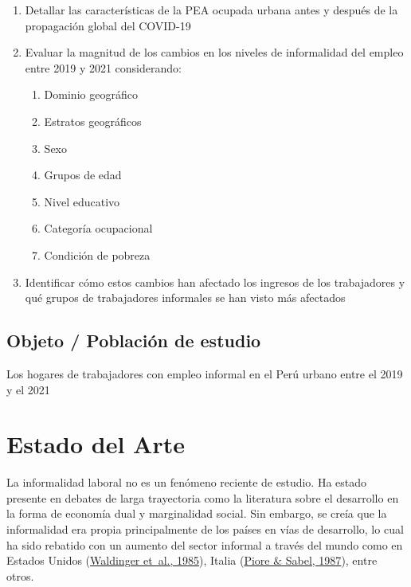 \documentclass[
  letterpaper,
  12pt,
  oneside,
  spanish,
  doublespacing,
  headsepline,
  parskip]{MastersDoctoralThesis}
\begin{document}
\begin{enumerate}
\def\labelenumi{\arabic{enumi}.}
\item
  Detallar las características de la PEA ocupada urbana antes y después
  de la propagación global del COVID-19
\item
  Evaluar la magnitud de los cambios en los niveles de informalidad del
  empleo entre 2019 y 2021 considerando:

  \begin{enumerate}
  \def\labelenumii{\roman{enumii}.}
  \item
    Dominio geográfico
  \item
    Estratos geográficos
  \item
    Sexo
  \item
    Grupos de edad
  \item
    Nivel educativo
  \item
    Categoría ocupacional
  \item
    Condición de pobreza
  \end{enumerate}
\item
  Identificar cómo estos cambios han afectado los ingresos de los
  trabajadores y qué grupos de trabajadores informales se han visto más
  afectados
\end{enumerate}

\hypertarget{objeto-poblaciuxf3n-de-estudio}{%
\section{Objeto / Población de
estudio}\label{objeto-poblaciuxf3n-de-estudio}}

Los hogares de trabajadores con empleo informal en el Perú urbano entre
el 2019 y el 2021


\hypertarget{sec-estado}{%
\chapter{Estado del Arte}\label{sec-estado}}

La informalidad laboral no es un fenómeno reciente de estudio. Ha estado
presente en debates de larga trayectoria como la literatura sobre el
desarrollo en la forma de economía dual y marginalidad social. Sin
embargo, se creía que la informalidad era propia principalmente de los
países en vías de desarrollo, lo cual ha sido rebatido con un aumento
del sector informal a través del mundo como en Estados Unidos
(\protect\hyperlink{ref-waldinger1985}{Waldinger et~al., 1985}), Italia
(\protect\hyperlink{ref-piore1987}{Piore \& Sabel, 1987}), entre otros.
\end{document}
